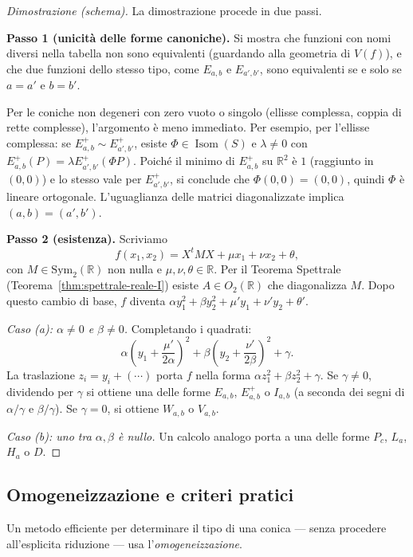 \documentclass[11pt, a4paper]{book}
\theoremstyle{definition}
\theoremstyle{plain}
\theoremstyle{remark}
\newcommand{\R}{\mathbb{R}}
\DeclareMathOperator{\Isom}{Isom}
\begin{document}
\begin{proof}[Dimostrazione (schema)]
La dimostrazione procede in due passi.

\textbf{Passo 1 (unicità delle forme canoniche).} Si mostra che funzioni con nomi diversi nella tabella non sono equivalenti (guardando alla geometria di $V(f)$), e che due funzioni dello stesso tipo, come $E_{a,b}$ e $E_{a',b'}$, sono equivalenti se e solo se $a=a'$ e $b=b'$.

Per le coniche non degeneri con zero vuoto o singolo (ellisse complessa, coppia di rette complesse), l'argomento è meno immediato. Per esempio, per l'ellisse complessa: se $E_{a,b}^+ \sim E_{a',b'}^+$, esiste $\Phi \in \Isom(S)$ e $\lambda \neq 0$ con $E_{a,b}^+(P) = \lambda E_{a',b'}^+(\Phi P)$. Poiché il minimo di $E_{a,b}^+$ su $\R^2$ è $1$ (raggiunto in $(0,0)$) e lo stesso vale per $E_{a',b'}^+$, si conclude che $\Phi(0,0)=(0,0)$, quindi $\Phi$ è lineare ortogonale. L'uguaglianza delle matrici diagonalizzate implica $(a,b)=(a',b')$.

\textbf{Passo 2 (esistenza).} Scriviamo
\[
  f(x_1, x_2) = X^t M X + \mu x_1 + \nu x_2 + \theta,
\]
con $M \in \mathrm{Sym}_2(\R)$ non nulla e $\mu, \nu, \theta \in \R$. Per il Teorema Spettrale (Teorema~\ref{thm:spettrale-reale-I}) esiste $A \in O_2(\R)$ che diagonalizza $M$. Dopo questo cambio di base, $f$ diventa $\alpha y_1^2 + \beta y_2^2 + \mu' y_1 + \nu' y_2 + \theta'$.

\textit{Caso (a): $\alpha \neq 0$ e $\beta \neq 0$.} Completando i quadrati:
\[
  \alpha\!\left(y_1+\frac{\mu'}{2\alpha}\right)^2 + \beta\!\left(y_2+\frac{\nu'}{2\beta}\right)^2 + \gamma.
\]
La traslazione $z_i = y_i + (\cdots)$ porta $f$ nella forma $\alpha z_1^2 + \beta z_2^2 + \gamma$. Se $\gamma \neq 0$, dividendo per $\gamma$ si ottiene una delle forme $E_{a,b}$, $E^+_{a,b}$ o $I_{a,b}$ (a seconda dei segni di $\alpha/\gamma$ e $\beta/\gamma$). Se $\gamma = 0$, si ottiene $W_{a,b}$ o $V_{a,b}$.

\textit{Caso (b): uno tra $\alpha, \beta$ è nullo.} Un calcolo analogo porta a una delle forme $P_c$, $L_a$, $H_a$ o $D$.
\end{proof}

\subsection{Omogeneizzazione e criteri pratici}

Un metodo efficiente per determinare il tipo di una conica — senza procedere all'esplicita riduzione — usa l'\emph{omogeneizzazione}.
\end{document}
